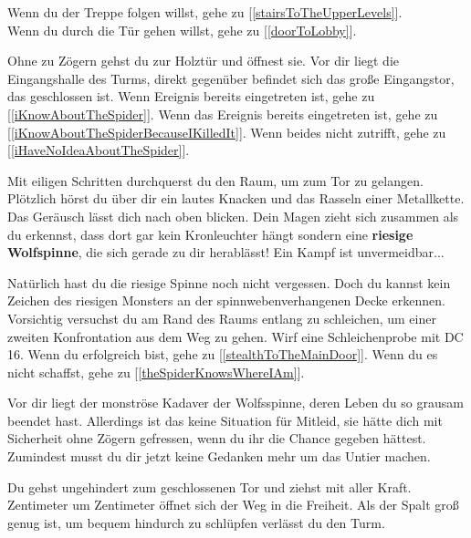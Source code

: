 Wenn du der Treppe folgen willst, gehe zu [\ref{stairsToTheUpperLevels}].
\\Wenn du durch die Tür gehen willst, gehe zu [\ref{doorToLobby}].


Ohne zu Zögern gehst du zur Holztür und öffnest sie. Vor dir liegt die Eingangshalle des Turms, direkt gegenüber befindet sich das große Eingangstor, das geschlossen ist. Wenn Ereignis  bereits eingetreten ist, gehe zu [\ref{iKnowAboutTheSpider}]. Wenn das Ereignis  bereits eingetreten ist, gehe zu [\ref{iKnowAboutTheSpiderBecauseIKilledIt}].
Wenn beides nicht zutrifft, gehe zu [\ref{iHaveNoIdeaAboutTheSpider}].


Mit eiligen Schritten durchquerst du den Raum, um zum Tor zu gelangen. Plötzlich hörst du über dir ein lautes Knacken und das Rasseln einer Metallkette.
Das Geräusch lässt dich nach oben blicken. Dein Magen zieht sich zusammen als du erkennst, dass dort gar kein Kronleuchter hängt sondern eine \textbf{riesige Wolfspinne}, die sich gerade zu dir herablässt! Ein Kampf ist unvermeidbar...



Natürlich hast du die riesige Spinne noch nicht vergessen. Doch du kannst kein Zeichen des riesigen Monsters an der spinnwebenverhangenen Decke erkennen. Vorsichtig versuchst du am Rand des Raums entlang zu schleichen, um einer zweiten Konfrontation aus dem Weg zu gehen. Wirf eine Schleichenprobe mit DC 16. Wenn du erfolgreich bist, gehe zu [\ref{stealthToTheMainDoor}].
Wenn du es nicht schaffst, gehe zu [\ref{theSpiderKnowsWhereIAm}].


Vor dir liegt der monströse Kadaver der Wolfsspinne, deren Leben du so grausam beendet hast. Allerdings ist das keine Situation für Mitleid, sie hätte dich mit Sicherheit ohne Zögern gefressen, wenn du ihr die Chance gegeben hättest. Zumindest musst du dir jetzt keine Gedanken mehr um das Untier machen.

Du gehst ungehindert zum geschlossenen Tor und ziehst mit aller Kraft. Zentimeter um Zentimeter öffnet sich der Weg in die Freiheit. Als der Spalt groß genug ist, um bequem hindurch zu schlüpfen verlässt du den Turm.

